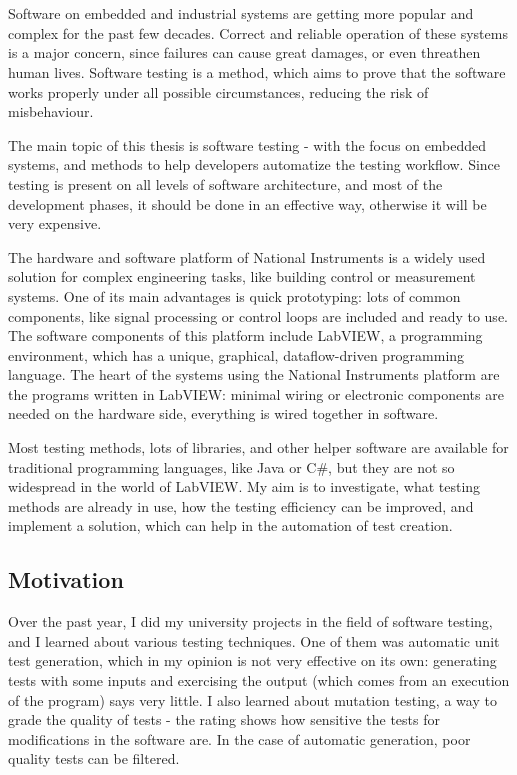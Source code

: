 \chapter{\bevezetes}

Software on embedded and industrial systems are getting more popular and complex for the past few decades. Correct and reliable operation of these systems is a major concern, since failures can cause great damages, or even threathen human lives. Software testing is a method, which aims to prove that the software works properly under all possible circumstances, reducing the risk of misbehaviour.

The main topic of this thesis is software testing - with the focus on embedded systems, and methods to help developers automatize the testing workflow. Since testing is present on all levels of software architecture, and most of the development phases, it should be done in an effective way, otherwise it will be very expensive. 

The hardware and software platform of National Instruments is a widely used solution for complex engineering tasks, like building control or measurement systems. One of its main advantages is quick prototyping: lots of common components, like signal processing or control loops are included and ready to use. The software components of this platform include LabVIEW, a programming environment, which has a unique, graphical, dataflow-driven programming language. The heart of the systems using the National Instruments platform are the programs written in LabVIEW: minimal wiring or electronic components are needed on the hardware side, everything is wired together in software.

Most testing methods, lots of libraries, and other helper software are available for traditional programming languages, like Java or C\#, but they are not so widespread in the world of LabVIEW. My aim is to investigate, what testing methods are already in use, how the testing efficiency can be improved, and implement a solution, which can help in the automation of test creation.
\section{Motivation}
Over the past year, I did my university projects in the field of software testing, and I learned about various testing techniques. One of them was automatic unit test generation, which in my opinion is not very effective on its own: generating tests with some inputs and exercising the output (which comes from an execution of the program) says very little. I also learned about mutation testing, a way to grade the quality of tests - the rating shows how sensitive the tests for modifications in the software are. In the case of automatic generation, poor quality tests can be filtered.

